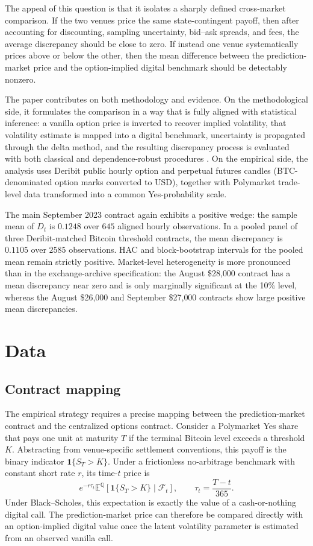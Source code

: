 \documentclass[11pt]{article}
\numberwithin{equation}{section}
\theoremstyle{plain}
\begin{document}
The appeal of this question is that it isolates a sharply defined cross-market comparison. If the two venues price the same state-contingent payoff, then after accounting for discounting, sampling uncertainty, bid--ask spreads, and fees, the average discrepancy should be close to zero. If instead one venue systematically prices above or below the other, then the mean difference between the prediction-market price and the option-implied digital benchmark should be detectably nonzero.

The paper contributes on both methodology and evidence. On the methodological side, it formulates the comparison in a way that is fully aligned with statistical inference: a vanilla option price is inverted to recover implied volatility, that volatility estimate is mapped into a digital benchmark, uncertainty is propagated through the delta method, and the resulting discrepancy process is evaluated with both classical and dependence-robust procedures \citep{casella2002,newey1987}. On the empirical side, the analysis uses Deribit public hourly option and perpetual futures candles (BTC-denominated option marks converted to USD), together with Polymarket trade-level data transformed into a common Yes-probability scale.

The main September 2023 contract again exhibits a positive wedge: the sample mean of $D_t$ is $0.1248$ over $645$ aligned hourly observations. In a pooled panel of three Deribit-matched Bitcoin threshold contracts, the mean discrepancy is $0.1105$ over $2585$ observations. HAC and block-bootstrap intervals for the pooled mean remain strictly positive. Market-level heterogeneity is more pronounced than in the exchange-archive specification: the August \$28{,}000 contract has a mean discrepancy near zero and is only marginally significant at the 10\% level, whereas the August \$26{,}000 and September \$27{,}000 contracts show large positive mean discrepancies.

\section{Data}
\subsection{Contract mapping}
The empirical strategy requires a precise mapping between the prediction-market contract and the centralized options contract. Consider a Polymarket Yes share that pays one unit at maturity $T$ if the terminal Bitcoin level exceeds a threshold $K$. Abstracting from venue-specific settlement conventions, this payoff is the binary indicator $\mathbf{1}\{S_T > K\}$. Under a frictionless no-arbitrage benchmark with constant short rate $r$, its time-$t$ price is
\[
e^{-r\tau_t}\mathbb{E}^{\mathbb{Q}}\!\left[\mathbf{1}\{S_T > K\}\mid\mathcal{F}_t\right],
\qquad
\tau_t = \frac{T-t}{365}.
\]
Under Black--Scholes, this expectation is exactly the value of a cash-or-nothing digital call. The prediction-market price can therefore be compared directly with an option-implied digital value once the latent volatility parameter is estimated from an observed vanilla call.
\end{document}
